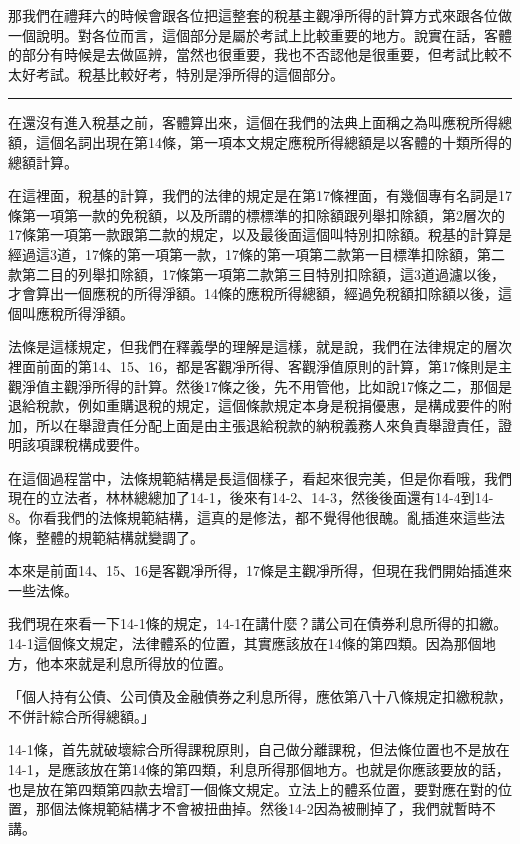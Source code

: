 \documentclass[oneside,sub3section]{ctexbook}
\begin{document}
那我們在禮拜六的時候會跟各位把這整套的稅基主觀凈所得的計算方式來跟各位做一個說明。對各位而言，這個部分是屬於考試上比較重要的地方。說實在話，客體的部分有時候是去做區辨，當然也很重要，我也不否認他是很重要，但考試比較不太好考試。稅基比較好考，特別是淨所得的這個部分。

\begin{center}\rule{0.5\linewidth}{0.5pt}\end{center}

在還沒有進入稅基之前，客體算出來，這個在我們的法典上面稱之為叫應稅所得總額，這個名詞出現在第14條，第一項本文規定應稅所得總額是以客體的十類所得的總額計算。

在這裡面，稅基的計算，我們的法律的規定是在第17條裡面，有幾個專有名詞是17條第一項第一款的免稅額，以及所謂的標標準的扣除額跟列舉扣除額，第2層次的17條第一項第一款跟第二款的規定，以及最後面這個叫特別扣除額。稅基的計算是經過這3道，17條的第一項第一款，17條的第一項第二款第一目標準扣除額，第二款第二目的列舉扣除額，17條第一項第二款第三目特別扣除額，這3道過濾以後，才會算出一個應稅的所得淨額。14條的應稅所得總額，經過免稅額扣除額以後，這個叫應稅所得淨額。

法條是這樣規定，但我們在釋義學的理解是這樣，就是說，我們在法律規定的層次裡面前面的第14、15、16，都是客觀凈所得、客觀淨值原則的計算，第17條則是主觀淨值主觀淨所得的計算。然後17條之後，先不用管他，比如說17條之二，那個是退給稅款，例如重購退稅的規定，這個條款規定本身是稅捐優惠，是構成要件的附加，所以在舉證責任分配上面是由主張退給稅款的納稅義務人來負責舉證責任，證明該項課稅構成要件。

在這個過程當中，法條規範結構是長這個樣子，看起來很完美，但是你看哦，我們現在的立法者，林林總總加了14-1，後來有14-2、14-3，然後後面還有14-4到14-8。你看我們的法條規範結構，這真的是修法，都不覺得他很醜。亂插進來這些法條，整體的規範結構就變調了。

本來是前面14、15、16是客觀凈所得，17條是主觀凈所得，但現在我們開始插進來一些法條。

我們現在來看一下14-1條的規定，14-1在講什麼？講公司在債券利息所得的扣繳。14-1這個條文規定，法律體系的位置，其實應該放在14條的第四類。因為那個地方，他本來就是利息所得放的位置。

「個人持有公債、公司債及金融債券之利息所得，應依第八十八條規定扣繳稅款，不併計綜合所得總額。」

14-1條，首先就破壞綜合所得課稅原則，自己做分離課稅，但法條位置也不是放在14-1，是應該放在第14條的第四類，利息所得那個地方。也就是你應該要放的話，也是放在第四類第四款去增訂一個條文規定。立法上的體系位置，要對應在對的位置，那個法條規範結構才不會被扭曲掉。然後14-2因為被刪掉了，我們就暫時不講。
\end{document}

